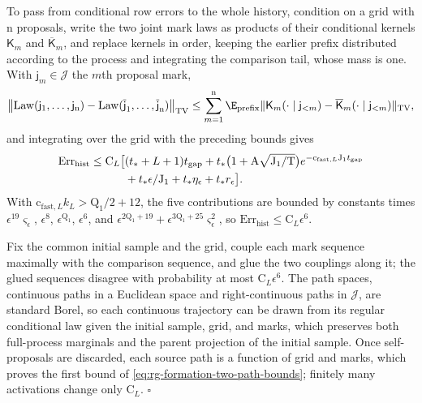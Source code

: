 To pass from conditional row errors to the whole history, condition on a grid
with \(\mathrm n\) proposals, write the two joint mark laws as products of
their conditional kernels \(\mathsf K_m\) and \(\overline{\mathsf K}_m\), and
replace kernels in order, keeping the earlier prefix distributed according to
the process and integrating the comparison tail, whose mass is one. With
\(\mathsf j_m\in\mathcal J\) the \(m\)th proposal mark,
\begin{equation}
 \bigl\|\operatorname{Law}(\mathsf j_1,\ldots,\mathsf j_{\mathrm n})
          -\operatorname{Law}(\overline{\mathsf j}_1,\ldots,\overline{\mathsf j}_{\mathrm n})\bigr\|_{\mathrm{TV}}
 \le \sum_{m=1}^{\mathrm n}
       \E_{\text{prefix}}
       \|\mathsf K_m(\cdot\mid\mathsf j_{<m})
                 -\overline{\mathsf K}_m(\cdot\mid\mathsf j_{<m})\|_{\mathrm{TV}},
 \label{eq:rg-formation-history-telescoping}
\end{equation}
and integrating over the grid with the preceding bounds gives
\begin{align}
 \mathrm{Err}_{\mathrm{hist}}\le \mathrm C_L\big[
 &(t_*+L+1)t_{\mathrm{gap}}
 +t_*\bigl(1+\mathrm A\sqrt{\mathrm J_1/\mathrm T}\bigr)
                      e^{-\mathrm c_{\mathrm{fast},L}\mathrm J_1t_{\mathrm{gap}}}
 \notag\\
 &+t_*\epsilon/\mathrm J_1
       +t_*\eta_\epsilon+t_*r_\epsilon\big].
 \label{eq:rg-formation-full-history-error}
\end{align}
With \(\mathrm c_{\mathrm{fast},L}k_L>\mathrm Q_1/2+12\), the five contributions
are bounded by constants times \(\epsilon^{19}\varsigma_\epsilon\),
\(\epsilon^8\), \(\epsilon^{\mathrm Q_1}\), \(\epsilon^6\), and
\(\epsilon^{2\mathrm Q_1+19}+\epsilon^{3\mathrm Q_1+25}\varsigma_\epsilon^2\), so
\(\mathrm{Err}_{\mathrm{hist}}\le\mathrm C_L\epsilon^6\).

Fix the common initial sample and the grid, couple each mark sequence
maximally with the comparison sequence, and glue the two couplings along it;
the glued sequences disagree with probability at most
\(\mathrm C_L\epsilon^6\). The path spaces, continuous paths in a Euclidean
space and right-continuous paths in \(\mathcal J\), are standard Borel, so each
continuous trajectory can be drawn from its regular conditional law given the
initial sample, grid, and marks, which preserves both full-process marginals
and the parent projection of the initial sample. Once self-proposals are
discarded, each source path is a function of grid and marks, which proves the
first bound of \cref{eq:rg-formation-two-path-bounds}; finitely many
activations change only \(\mathrm C_L\). \hfill\(\square\)

